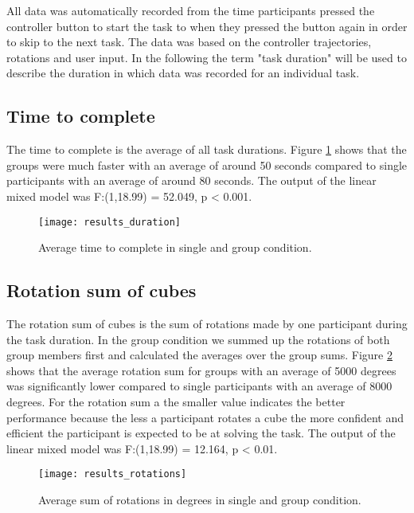  All data was automatically recorded from the time participants pressed the controller button to start the task to when they pressed the button again in order to skip to the next task. The data was based on the controller trajectories, rotations and user input.  In the following the term "task duration" will be used to describe the duration in which data was recorded for an individual task.

\subsection{Time to complete}
The time to complete is the average of all task durations.  Figure \ref{fig:results_duration} shows that the groups were much faster with an average of around 50 seconds compared to single participants with an average of around 80 seconds. The output of the linear mixed model was F:(1,18.99) = 52.049, p < 0.001.

\begin{figure}[h]
\centering
\texttt{[image: results\_duration]}
\caption{Average time to complete in single and group condition.} \label{fig:results_duration}
\end{figure}

\subsection{Rotation sum of cubes}
The rotation sum of cubes is the sum of rotations made by one participant during the task duration. In the group condition we summed up the rotations of both group members first and calculated the averages over the group sums. Figure \ref{fig:results_rotations} shows that the average rotation sum for groups with an average of 5000 degrees was significantly lower compared to single participants with an average of 8000 degrees. For the rotation sum a the smaller value indicates the better performance because the less a participant rotates a cube the more confident and efficient the participant is expected to be at solving the task. The output of the linear mixed model was F:(1,18.99) = 12.164, p < 0.01.

\begin{figure}[h]
\centering
\texttt{[image: results\_rotations]}
\caption{Average sum of rotations in degrees in single and group condition.}
\label{fig:results_rotations}
\end{figure}

